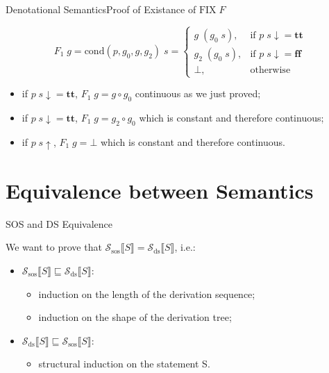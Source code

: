 \documentclass{beamer}
\newcommand{\sem}[2]{\mathcal{#1} \llbracket #2 \rrbracket}
\newcommand{\tr}{\mathbf{tt}}
\newcommand{\ff}{\mathbf{ff}}
\newcommand{\undefined}{\uparrow}
\newcommand{\defined}{\!\downarrow}
\begin{document}
\begin{frame}{Denotational Semantics}{Proof of Existance of $\mathrm{FIX}\;F$}
\begin{overprint}
        \begin{equation*}
            F_1\;g =
            \mathrm{cond}(p, g_0, g, g_2)\;s =
            \begin{cases}
                g\;(g_0\;s),   & \mbox{if } p\;s\defined = \tr \\
                g_2\;(g_0\;s), & \mbox{if } p\;s\defined = \ff \\
                \bot,          & \mbox{otherwise}
            \end{cases}
        \end{equation*}
        \begin{itemize}
            \item if $p\;s\defined = \tr$, $F_1\;g = g \circ g_0$ continuous as we just proved;
            \item if $p\;s\defined = \tr$, $F_1\;g = g_2 \circ g_0$ which is constant and  therefore continuous;
            \item if $p\;s\!\undefined$, $F_1\;g = \bot$ which is constant and  therefore continuous.
        \end{itemize}
    \end{overprint}

\end{frame}

\section{Equivalence between Semantics}

\begin{frame}{SOS and DS Equivalence}

    We want to prove that $\sem{S_\mathrm{sos}}{S} = \sem{S_\mathrm{ds}}{S}$, i.e.:
    \begin{itemize}
        \item $\sem{S_\mathrm{sos}}{S} \sqsubseteq \sem{S_\mathrm{ds}}{S}$:
              \begin{itemize}
                  \item induction on the length of the derivation sequence;
                  \item induction on the shape of the derivation tree;
              \end{itemize}
        \item $\sem{S_\mathrm{ds}}{S} \sqsubseteq \sem{S_\mathrm{sos}}{S}$:
              \begin{itemize}
                  \item structural induction on the statement S.
              \end{itemize}
    \end{itemize}

\end{frame}
\end{document}
